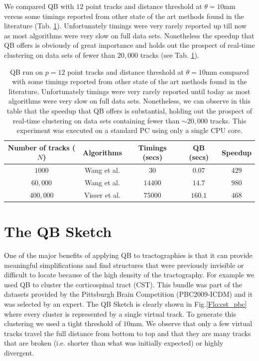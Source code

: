 \documentclass[preprint,authoryear,a4paper,10pt,onecolumn]{elsarticle}
\begin{document}
We compared QB with $12$ point tracks and distance threshold at
$\theta=10$mm versus some timings reported from other state of the art
methods found in the literature (Tab. \ref{Flo:timings}). Unfortunately
timings were very rarely reported up till now as most algorithms were
very slow on full data sets. Nonetheless the speedup that QB offers is
obviously of great importance and holds out the prospect of real-time
clustering on data sets of fewer than $20,000$ tracks (see
Tab. \ref{Flo:timings}).

%
\begin{table}
\small\addtolength{\tabcolsep}{-5pt}

\begin{centering}
\begin{tabular}{|c|c|c|c|c|}
\hline 
Number of tracks ($N$) & Algorithms & Timings (secs) & QB (secs) & Speedup\tabularnewline
\hline
\hline 
$1000$ & Wang et al. \cite{wang2010tractography} & $30$ & $0.07$ & $429$\tabularnewline
\hline 
$60,000$ & Wang et al. \cite{wang2010tractography} & $14400$ & $14.7$ & $980$\tabularnewline
\hline 
$400,000$ & Visser et al. \cite{Visser2010} & $75000$ & $160.1$ & $468$\tabularnewline
\hline
\end{tabular}
\par\end{centering}

\caption{QB run on $p=12$ point tracks and distance threshold at $\theta=10$mm
compared with some timings reported from other state of the art methods
found in the literature. Unfortunately timings were very rarely reported
until today as most algorithms were very slow on full data sets. Nonetheless,
we can observe in this table that the speedup that QB offers is substantial,
holding out the prospect of real-time clustering on data sets containing
fewer than $\sim20,000$ tracks. This experiment was executed on a
standard PC using only a single CPU core. }

\label{Flo:timings}
\end{table}

\section{The QB Sketch}

One of the major benefits of applying QB to tractographies is that it
can provide meaningful simplifications and find structures that were
previously invisible or difficult to locate because of the high density
of the tractography. For example we used QB to cluster the corticospinal
tract (CST). This bundle was part of the datasets provided by the
Pittsburgh Brain Competition (PBC2009-ICDM) and it was selected by an
expert. The QB Sketch is clearly shown in Fig.\ref{Flo:cst_pbc} where
every cluster is represented by a single virtual track. To generate this
clustering we used a tight threshold of $10$mm. We observe that only a
few virtual tracks travel the full distance from bottom to top and that
they are many tracks that are broken (i.e. shorter than what was
initially expected) or highly divergent.
\end{document}
